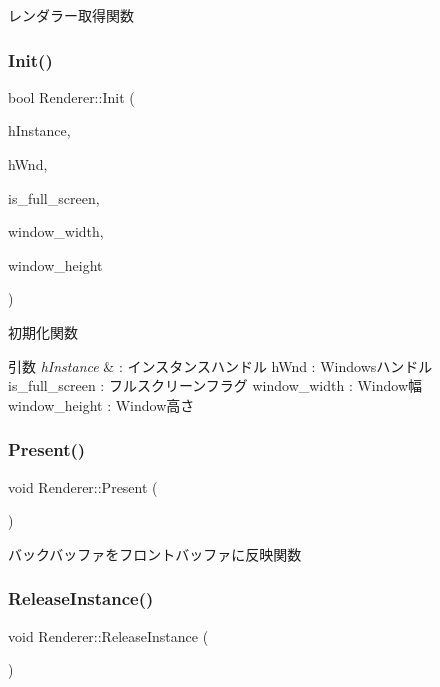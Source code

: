 レンダラー取得関数 

\mbox{\label{class_renderer_a8d576add80187f5be3f24ec6a8108100}} 
\subsubsection{\texorpdfstring{Init()}{Init()}}
{\footnotesize\ttfamily bool Renderer\+::\+Init (\begin{DoxyParamCaption}\item[{H\+I\+N\+S\+T\+A\+N\+CE}]{h\+Instance,  }\item[{H\+W\+ND}]{h\+Wnd,  }\item[{B\+O\+OL}]{is\+\_\+full\+\_\+screen,  }\item[{int}]{window\+\_\+width,  }\item[{int}]{window\+\_\+height }\end{DoxyParamCaption})}



初期化関数 


\begin{DoxyParams}{引数}
{\em h\+Instance} & \+: インスタンスハンドル h\+Wnd \+: Windowsハンドル is\+\_\+full\+\_\+screen \+: フルスクリーンフラグ window\+\_\+width \+: Window幅 window\+\_\+height \+: Window高さ \\
\hline
\end{DoxyParams}
\mbox{\label{class_renderer_a1dac4baae1fa79166442b0778a9c8728}} 
\subsubsection{\texorpdfstring{Present()}{Present()}}
{\footnotesize\ttfamily void Renderer\+::\+Present (\begin{DoxyParamCaption}{ }\end{DoxyParamCaption})}



バックバッファをフロントバッファに反映関数 

\mbox{\label{class_renderer_aa7ac523172faaf376ecddaed4bdc0781}} 
\subsubsection{\texorpdfstring{Release\+Instance()}{ReleaseInstance()}}
{\footnotesize\ttfamily void Renderer\+::\+Release\+Instance (\begin{DoxyParamCaption}{ }\end{DoxyParamCaption})\hspace{0.3cm}{\ttfamily [static]}}

